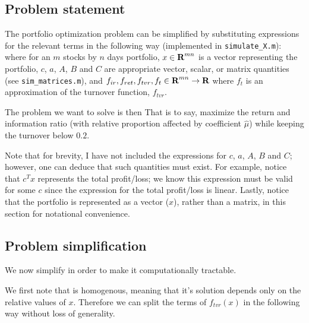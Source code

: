 \documentclass{article}
\begin{document}
\subsection{Problem statement}
    The portfolio optimization problem can be simplified 
        by substituting expressions for the relevant terms in the following way
        (implemented in \verb+simulate_X.m+):
    where for an $m$ stocks by $n$ days portfolio,
        \BI $x \in {\mbox{\bf R}}^{mn}$ is a vector representing the portfolio,
        \I  $c$, $a$, $A$, $B$ and $C$ are appropriate vector, scalar, 
            or matrix quantities (see \verb+sim_matrices.m+), and
        \I  $f_{ir}, f_{ret}, f_{tvr}, f_{t} \in {\mbox{\bf R}}^{mn} \to {\mbox{\bf R}}$
            where $f_{t}$ is an approximation of the turnover function, 
            $f_{tvr}$. \EI

    The problem we want to solve is then
    That is to say, maximize the return and information ratio
        (with relative proportion affected by coefficient $\hat{\mu}$)
        while keeping the turnover below $0.2$.


    Note that for brevity, I have not included the expressions for 
        $c$, $a$, $A$, $B$ and $C$; 
        however, one can deduce that such quantities must exist.
    For example, notice that $c^T x$ represents the total profit/loss;
        we know this expression must be valid for some $c$ 
        since the expression for the total profit/loss is linear.
    Lastly, notice that the portfolio is represented as a vector ($x$),
        rather than a matrix, in this section for notational convenience.

\subsection{Problem simplification}
    We now simplify  in order 
        to make it computationally tractable.

    We first note that  is homogenous,
        meaning that it's solution depends only on the relative values of $x$.
    Therefore we can split the terms of $f_{tvr}(x)$ in the following way
        without loss of generality.
\end{document}
